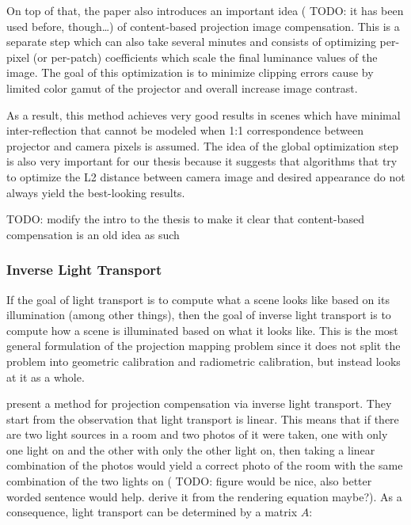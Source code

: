 On top of that, the paper also introduces an important idea ({\color{red} TODO: it has been used before, though\dots}) of content-based projection image compensation. This is a separate step which can also take several minutes and consists of optimizing per-pixel (or per-patch) coefficients which scale the final luminance values of the image. The goal of this optimization is to minimize clipping errors cause by limited color gamut of the projector and overall increase image contrast.

As a result, this method achieves very good results in scenes which have minimal inter-reflection that cannot be modeled when 1:1 correspondence between projector and camera pixels is assumed. The idea of the global optimization step is also very important for our thesis because it suggests that algorithms that try to optimize the L2 distance between camera image and desired appearance do not always yield the best-looking results.

{\color{red} TODO: modify the intro to the thesis to make it clear that content-based compensation is an old idea as such}

\subsubsection{Inverse Light Transport}
\label{section:background-projection_mapping-procams-inverse_lt}

If the goal of light transport is to compute what a scene looks like based on its illumination (among other things), then the goal of inverse light transport is to compute how a scene is illuminated based on what it looks like. This is the most general formulation of the projection mapping problem since it does not split the problem into geometric calibration and radiometric calibration, but instead looks at it as a whole.

\citet{Wetzstein2007} present a method for projection compensation via inverse light transport. They start from the observation that light transport is linear. This means that if there are two light sources in a room and two photos of it were taken, one with only one light on and the other with only the other light on, then taking a linear combination of the photos would yield a correct photo of the room with the same combination of the two lights on ({\color{red} TODO: figure would be nice, also better worded sentence would help. derive it from the rendering equation maybe?}). As a consequence, light transport can be determined by a matrix \(A\):


